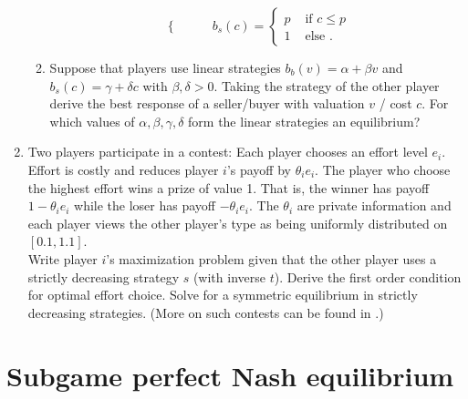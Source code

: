 \documentclass[a4paper,12pt]{article}
\begin{document}
\begin{enumerate}
\begin{enumerate}
\begin{equation*}
\begin{cases}
      \end{cases}
    \qquad
      b_s(c)=
      \begin{cases}
        p & \text{ if }c\leq p\\
        1 & \text{ else }.
      \end{cases}
    \end{equation*}
    \item Suppose that players use linear strategies $b_b(v)=\alpha+\beta v$ and $b_s(c)=\gamma+\delta c$ with $\beta,\delta>0$. Taking the strategy of the other player derive the best response of a seller/buyer with valuation $v$ / cost $c$. For which values of $\alpha,\beta,\gamma,\delta$ form the linear strategies an equilibrium?
    \end{enumerate}
  \item Two players participate in a contest: Each player chooses an effort level $e_i$. Effort is costly and reduces player $i$'s payoff by  $\theta _ie_i$. The player who choose the highest effort wins a prize of value 1. That is, the winner has payoff $1-\theta _i e_i$ while the loser has payoff $-\theta _i e_i$. The $\theta _i$ are private information and each player views the other player's type as being uniformly distributed on $[0.1,1.1]$. \\
    Write player $i$'s maximization problem given that the other player uses a strictly decreasing strategy $s$ (with inverse $t$). Derive the first order condition for optimal effort choice. Solve for a symmetric equilibrium in strictly decreasing strategies.
    (More on such contests can be found in \cite{moldovanu2001optimal}.)
\end{enumerate}

\section{Subgame perfect Nash equilibrium}
\label{sec:subgame-perfect-nash}
\end{document}
